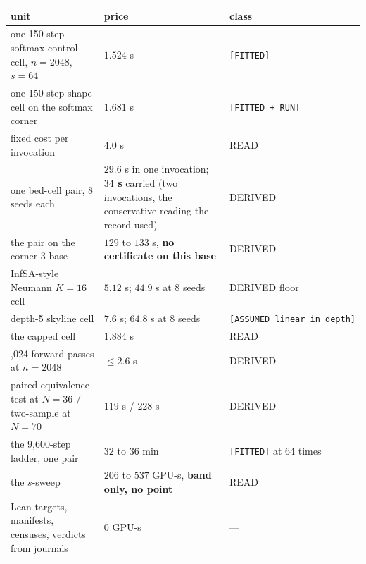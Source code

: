 \documentclass[11pt,a4paper]{article}
\newcounter{none}                 %
\theoremstyle{plain}
\theoremstyle{definition}
\theoremstyle{remark}
\begin{document}
{\def\LTcaptype{none} %
\begin{longtable}[]{@{}
  >{\raggedright\arraybackslash}p{}
  >{\raggedright\arraybackslash}p{}
  >{\raggedright\arraybackslash}p{}@{}}
\toprule\noalign{}
\begin{minipage}[b]{\linewidth}\raggedright
unit
\end{minipage} & \begin{minipage}[b]{\linewidth}\raggedright
price
\end{minipage} & \begin{minipage}[b]{\linewidth}\raggedright
class
\end{minipage} \\
\midrule\noalign{}
\endhead
\bottomrule\noalign{}
\endlastfoot
one 150-step softmax control cell, \(n=2048\), \(s=64\) & \(1.524\) s &
\texttt{{[}FITTED{]}} \\
one 150-step shape cell on the softmax corner & \(1.681\) s &
\texttt{{[}FITTED\ +\ RUN{]}} \\
fixed cost per invocation & \(4.0\) s & READ \\
one bed-cell pair, 8 seeds each & \(29.6\) s in one invocation;
\textbf{\(34\) s} carried (two invocations, the conservative reading the
record used) & DERIVED \\
the pair on the corner-3 base & \(129\) to \(133\) s, \textbf{no
certificate on this base} & DERIVED \\
InfSA-style Neumann \(K=16\) cell & \(5.12\) s; \(44.9\) s at 8 seeds &
DERIVED floor \\
depth-5 skyline cell & \(7.6\) s; \(64.8\) s at 8 seeds &
\texttt{{[}ASSUMED\ linear\ in\ depth{]}} \\
the capped cell & \(1.884\) s & READ \\
1,024 forward passes at \(n=2048\) & \(\le2.6\) s & DERIVED \\
paired equivalence test at \(N=36\) / two-sample at \(N=70\) & \(119\) s
/ \(228\) s & DERIVED \\
the 9,600-step ladder, one pair & \(32\) to \(36\) min &
\texttt{{[}FITTED{]}} at 64 times \\
the \(s\)-sweep & \(206\) to \(537\) GPU-s, \textbf{band only, no point}
& READ \\
Lean targets, manifests, censuses, verdicts from journals & \(0\) GPU-s
& --- \\
\end{longtable}
}
\end{document}
